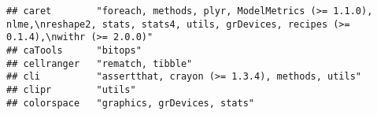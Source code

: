 \documentclass[]{article}
\begin{document}
\begin{verbatim}
## caret        "foreach, methods, plyr, ModelMetrics (>= 1.1.0), nlme,\nreshape2, stats, stats4, utils, grDevices, recipes (>= 0.1.4),\nwithr (>= 2.0.0)"                                                                                                                                                                                                                                                                                                                                            
## caTools      "bitops"                                                                                                                                                                                                                                                                                                                                                                                                                                                                              
## cellranger   "rematch, tibble"                                                                                                                                                                                                                                                                                                                                                                                                                                                                     
## cli          "assertthat, crayon (>= 1.3.4), methods, utils"                                                                                                                                                                                                                                                                                                                                                                                                                                       
## clipr        "utils"                                                                                                                                                                                                                                                                                                                                                                                                                                                                               
## colorspace   "graphics, grDevices, stats"                                                                                                                                                                                                                                                                                                                                                                                                                                                          

\end{verbatim}
\end{document}
